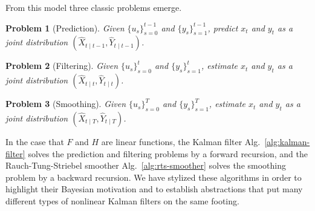\documentclass[oneside, article]{memoir}
\newtheorem{problem}{Problem}
\begin{document}
From this model three classic problems emerge.
\begin{problem}[Prediction]\label{problem:prediction}
  Given \(\{u_s\}_{s=0}^{t-1}\) and \(\{y_s\}_{s=1}^{t-1}\), predict
  \(x_t\) and \(y_t\) as a joint distribution \((\hat X_{t \mid t-1},
  \hat Y_{t \mid t-1})\).
\end{problem}

\begin{problem}[Filtering]\label{problem:filtering}
  Given \(\{u_s\}_{s=0}^{t}\) and \(\{y_s\}_{s=1}^t\), estimate
  \(x_t\) and \(y_t\) as a joint distribution \((\hat X_{t \mid t},
  \hat Y_{t \mid t})\).
\end{problem}

\begin{problem}[Smoothing]\label{problem:smoothing}
  Given \(\{u_s\}_{s=0}^T\) and \(\{y_s\}_{s=1}^T\), estimate \(x_t\)
  and \(y_t\) as a joint distribution \((\hat X_{t \mid T}, \hat Y_{t
  \mid T})\).
\end{problem}
In the case that \(F\) and \(H\) are linear functions,
the Kalman filter Alg.~\ref{alg:kalman-filter} solves the prediction
and filtering problems by a forward recursion, and the
Rauch-Tung-Striebel smoother Alg.~\ref{alg:rts-smoother} solves the
smoothing problem by a backward recursion.
We have stylized these algorithms in order to highlight their
Bayesian motivation and to establish abstractions that put many
different types of nonlinear Kalman filters on the same footing.
\end{document}
